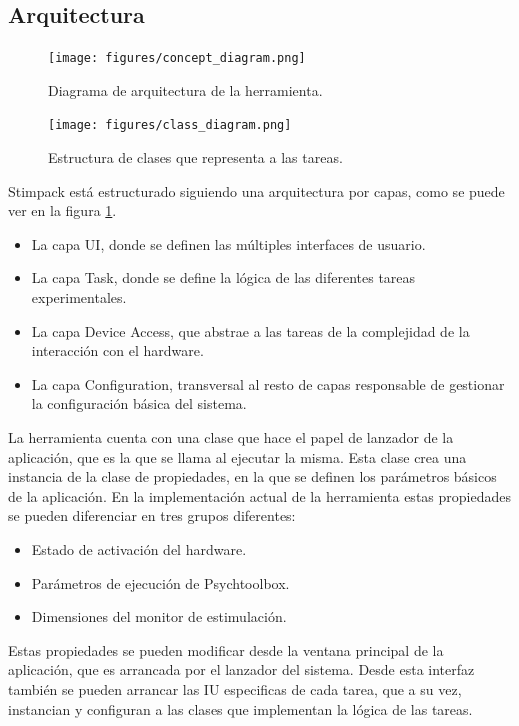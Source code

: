 \documentclass[conference]{IEEEtran}
\begin{document}
\subsection{Arquitectura}

\begin{figure}[htbp]
\centerline{\texttt{[image: figures/concept\_diagram.png]}}
\caption{Diagrama de arquitectura de la herramienta.}
\label{figConceptDiagram}
\end{figure}



\begin{figure}[bp]
\centerline{\texttt{[image: figures/class\_diagram.png]}}
\caption{Estructura de clases que representa a las tareas.}
\label{figClassDiagram}
\end{figure}

Stimpack está estructurado siguiendo una arquitectura por capas, como se puede ver en la figura \ref{figConceptDiagram}. 
\begin{itemize}
	\item La capa UI, donde se definen las múltiples interfaces de usuario.
	\item La capa Task, donde se define la lógica de las diferentes tareas experimentales.
	\item La capa Device Access, que abstrae a las tareas de la complejidad de la interacción con el hardware.
	\item La capa Configuration, transversal al resto de capas responsable de gestionar la configuración básica del sistema.
\end{itemize}
La herramienta cuenta con una clase que hace el papel de lanzador de la aplicación, que es la que se llama al ejecutar la misma. Esta clase crea una instancia de la clase de propiedades, en la que se definen los parámetros básicos de la aplicación. En la implementación actual de la herramienta estas propiedades se pueden diferenciar en tres grupos diferentes: 

\begin{itemize}
	\item Estado de activación del hardware.
	\item Parámetros de ejecución de Psychtoolbox.
	\item Dimensiones del monitor de estimulación.
\end{itemize}

Estas propiedades se pueden modificar desde la ventana principal de la aplicación, que es arrancada por el lanzador del sistema. Desde esta interfaz también se pueden arrancar las IU especificas de cada tarea, que a su vez, instancian y configuran a las clases que implementan la lógica de las tareas.
\end{document}
